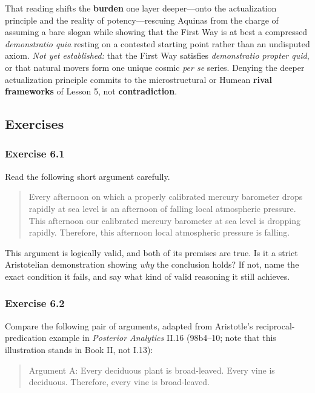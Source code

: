 That reading shifts the \textbf{burden} one layer deeper---onto the actualization principle and the reality of potency---rescuing Aquinas from the charge of assuming a bare slogan while showing that the First Way is at best a compressed \emph{demonstratio quia} resting on a contested starting point rather than an undisputed axiom. \emph{Not yet established:} that the First Way satisfies \emph{demonstratio propter quid}, or that natural movers form one unique cosmic \emph{per se} series. Denying the deeper actualization principle commits to the microstructural or Humean \textbf{rival frameworks} of Lesson 5, not \textbf{contradiction}.

\subsection{Exercises}

\subsubsection*{Exercise 6.1}
Read the following short argument carefully.

\begin{quote}
Every afternoon on which a properly calibrated mercury barometer drops rapidly at sea level is an afternoon of falling local atmospheric pressure. This afternoon our calibrated mercury barometer at sea level is dropping rapidly. Therefore, this afternoon local atmospheric pressure is falling.
\end{quote}

This argument is logically valid, and both of its premises are true. Is it a strict Aristotelian demonstration showing \emph{why} the conclusion holds? If not, name the exact condition it fails, and say what kind of valid reasoning it still achieves.

\subsubsection*{Exercise 6.2}
Compare the following pair of arguments, adapted from Aristotle's reciprocal-predication example in \emph{Posterior Analytics} II.16 (98b4--10; note that this illustration stands in Book II, not I.13):

\begin{quote}
Argument A: Every deciduous plant is broad-leaved. Every vine is deciduous. Therefore, every vine is broad-leaved.
\end{quote}

